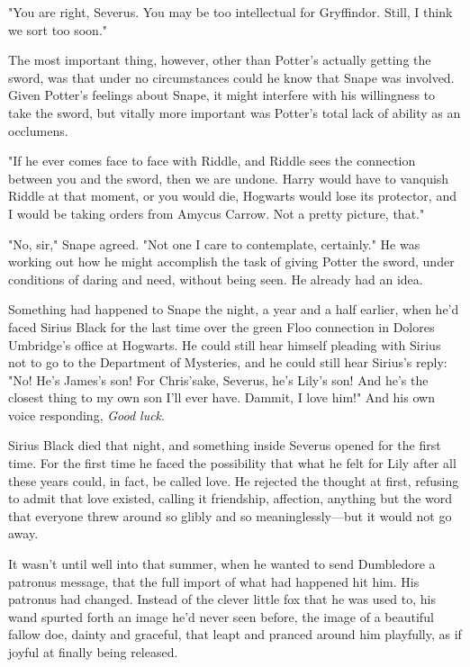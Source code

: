 "You are right, Severus. You may be too intellectual for Gryffindor. Still, I think we sort too soon."

The most important thing, however, other than Potter's actually getting the sword, was that under no circumstances could he know that Snape was involved. Given Potter's feelings about Snape, it might interfere with his willingness to take the sword, but vitally more important was Potter's total lack of ability as an occlumens.

"If he ever comes face to face with Riddle, and Riddle sees the connection between you and the sword, then we are undone. Harry would have to vanquish Riddle at that moment, or you would die, Hogwarts would lose its protector, and I would be taking orders from Amycus Carrow. Not a pretty picture, that."

"No, sir," Snape agreed. "Not one I care to contemplate, certainly." He was working out how he might accomplish the task of giving Potter the sword, under conditions of daring and need, without being seen. He already had an idea.

Something had happened to Snape the night, a year and a half earlier, when he'd faced Sirius Black for the last time over the green Floo connection in Dolores Umbridge's office at Hogwarts. He could still hear himself pleading with Sirius not to go to the Department of Mysteries, and he could still hear Sirius's reply: "No! He's James's son! For Chris'sake, Severus, he's Lily's son! And he's the closest thing to my own son I'll ever have. Dammit, I love him!" And his own voice responding, \emph{Good luck}.

Sirius Black died that night, and something inside Severus opened for the first time. For the first time he faced the possibility that what he felt for Lily after all these years could, in fact, be called love. He rejected the thought at first, refusing to admit that love existed, calling it friendship, affection, anything but the word that everyone threw around so glibly and so meaninglessly—but it would not go away.

It wasn't until well into that summer, when he wanted to send Dumbledore a patronus message, that the full import of what had happened hit him. His patronus had changed. Instead of the clever little fox that he was used to, his wand spurted forth an image he'd never seen before, the image of a beautiful fallow doe, dainty and graceful, that leapt and pranced around him playfully, as if joyful at finally being released.

